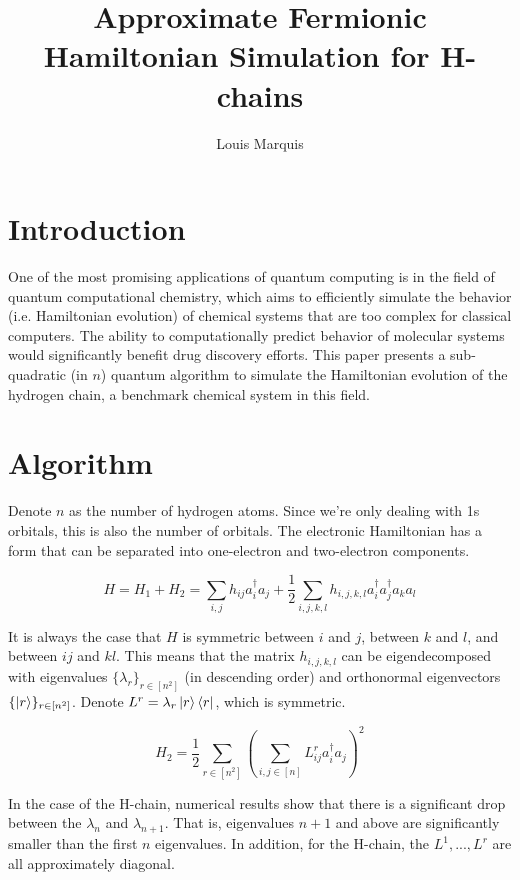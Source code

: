 \documentclass{article}
\begin{document}
\title{Approximate Fermionic Hamiltonian Simulation for H-chains}
\author{Louis Marquis}

\maketitle

\section{Introduction}

One of the most promising applications of quantum computing is in the field of quantum computational chemistry, which aims to efficiently simulate the behavior (i.e. Hamiltonian evolution) of chemical systems that are too complex for classical computers. The ability to computationally predict behavior of molecular systems would significantly benefit drug discovery efforts. This paper presents a sub-quadratic (in $n$) quantum algorithm to simulate the Hamiltonian evolution of the hydrogen chain, a benchmark chemical system in this field.

\section{Algorithm}

Denote $n$ as the number of hydrogen atoms. Since we're only dealing with 1s orbitals, this is also the number of orbitals. The electronic Hamiltonian has a form that can be separated into one-electron and two-electron components.

\begin{equation}
    H = H_1 + H_2 = \sum_{i, j} h_{ij}a_i^\dag a_j + \frac{1}{2}\sum_{i, j, k, l} h_{i, j, k, l} a_i^\dag a_j^\dag a_ka_l
\end{equation}

It is always the case that $H$ is symmetric between $i$ and $j$, between $k$ and $l$, and between $ij$ and $kl$. This means that the matrix $h_{i, j, k, l}$ can be eigendecomposed with eigenvalues $\{\lambda_r\}_{r \in [n^2]}$ (in descending order) and orthonormal eigenvectors $\{\ket{r}\}_{r \in [n^2]}$. Denote $L^r = \lambda_r \ket{r}\bra{r}$, which is symmetric.

\begin{equation}
    H_2 = \frac{1}{2}\sum_{r \in [n^2]} (\sum_{i, j \in [n]} L^r_{ij}a_i^\dag a_j)^2
\end{equation}

In the case of the H-chain, numerical results show that there is a significant drop between the $\lambda_n$ and $\lambda_{n + 1}$. That is, eigenvalues $n + 1$ and above are significantly smaller than the first $n$ eigenvalues. %
In addition, for the H-chain, the $L^1, ..., L^r$ are all approximately diagonal. %
\end{document}
